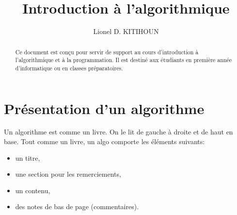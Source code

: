 \documentclass[12pt]{report}
\title{Introduction à l'algorithmique}
\author{Lionel D. K\small{ITIHOUN}}
\begin{document}
\maketitle

\begin{abstract}
  Ce document est conçu pour servir de support au cours d'introduction à l'algorithmique et à la programmation. Il est destiné aux étudiants en première année d'informatique ou en classes préparatoires.
\end{abstract}


\chapter{Présentation d'un algorithme}
Un algorithme est comme un livre. On le lit de gauche à droite et de haut en base. Tout comme un livre, un algo comporte les éléments suivants:
\begin{itemize}
  \item un titre,
  \item une section pour les remerciements,
  \item un contenu,
  \item des notes de bas de page (commentaires).
\end{itemize}
\end{document}
